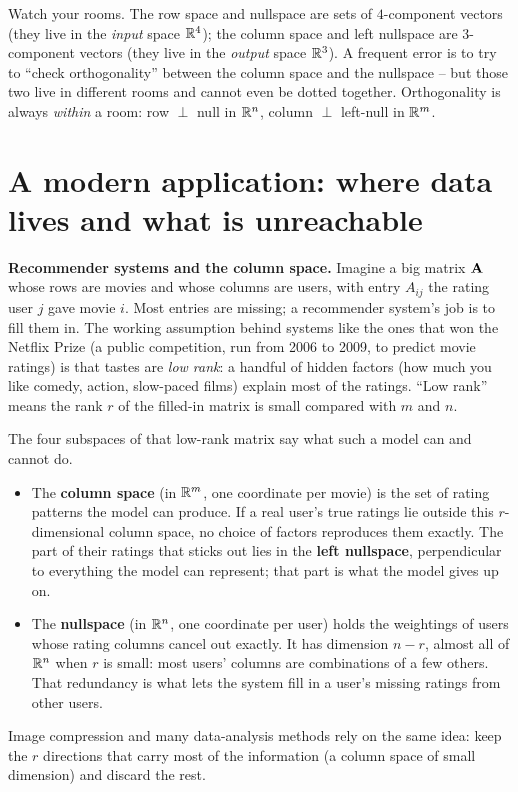 \begin{trapbox}
Watch your rooms. The row space and nullspace are sets of $4$-component vectors (they live in the
\emph{input} space $\mathbb{R}^4$); the column space and left nullspace are $3$-component vectors (they live
in the \emph{output} space $\mathbb{R}^3$). A frequent error is to try to ``check orthogonality'' between
the column space and the nullspace -- but those two live in different rooms and cannot even be
dotted together. Orthogonality is always \emph{within} a room: row $\perp$ null in $\mathbb{R}^n$, column
$\perp$ left-null in $\mathbb{R}^m$.
\end{trapbox}

\section{A modern application: where data lives and what is unreachable}

\begin{applicationbox}
\textbf{Recommender systems and the column space.} Imagine a big matrix $\mathbf{A}$ whose rows are
movies and whose columns are users, with entry $A_{ij}$ the rating user $j$ gave movie $i$. Most
entries are missing; a recommender system's job is to fill them in. The working assumption behind
systems like the ones that won the Netflix Prize (a public competition, run from 2006 to 2009, to
predict movie ratings) is that tastes are \emph{low rank}: a handful of hidden factors (how much
you like comedy, action, slow-paced films) explain most of the ratings. ``Low rank'' means the
rank $r$ of the filled-in matrix is small compared with $m$ and $n$.

The four subspaces of that low-rank matrix say what such a model can and cannot do.
\begin{itemize}
  \item The \textbf{column space} (in $\mathbb{R}^m$, one coordinate per movie) is the set of rating
  patterns the model can produce. If a real user's true ratings lie outside this $r$-dimensional
  column space, no choice of factors reproduces them exactly. The part of their ratings that sticks
  out lies in the \textbf{left nullspace}, perpendicular to everything the model can represent;
  that part is what the model gives up on.
  \item The \textbf{nullspace} (in $\mathbb{R}^n$, one coordinate per user) holds the weightings of users
  whose rating columns cancel out exactly. It has dimension $n-r$, almost all of $\mathbb{R}^n$ when $r$ is
  small: most users' columns are combinations of a few others. That redundancy is what lets the
  system fill in a user's missing ratings from other users.
\end{itemize}
Image compression and many data-analysis methods rely on the same idea: keep the $r$ directions
that carry most of the information (a column space of small dimension) and discard the rest.
\end{applicationbox}

